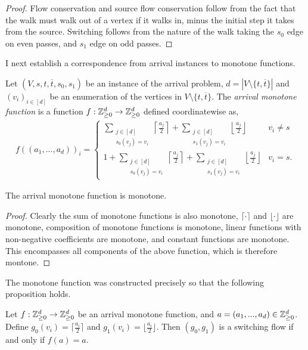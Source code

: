   \begin{proof}
    Flow conservation and source flow conservation follow from the fact that the walk must walk
    out of a vertex if it walks in, minus the initial step it takes from the source. Switching
    follows from the nature of the walk taking the $s_0$ edge on even passes, and $s_1$ edge on odd
    passes.
  \end{proof}
  I next establish a correspondence from arrival instances to monotone functions.
  \begin{definition}
    Let $(V, s, t, \overline{t}, s_0, s_1)$ be an instance of the arrival problem,
    $d = |V \setminus \{t, \overline{t}\}|$ and
    $(v_i)_{i \in [d]}$ be an enumeration of the vertices in 
    $V \setminus \{t, \overline{t}\}$. The \emph{arrival monotone function} is a function
    $f : \mathbb{Z}_{\geq 0}^d \to \mathbb{Z}_{\geq 0}^d$ defined coordinatewise as,
  \begin{align*}
    f((a_1, ..., a_d))_i = \begin{cases}
    \sum_{\substack{j \in [d] \\ s_0(v_j) = v_i}} \left\lceil \frac{a_j}{2} \right\rceil
      + \sum_{\substack{j \in [d] \\ s_1(v_j) = v_i}} \left\lfloor \frac{a_j}{2} \right\rfloor
      & v_i \neq s \\
    1 + \sum_{\substack{j \in [d] \\ s_0(v_j) = v_i}} \left\lceil \frac{a_j}{2} \right\rceil
      + \sum_{\substack{j \in [d] \\ s_1(v_j) = v_i}} \left\lfloor \frac{a_j}{2} \right\rfloor
      & v_i = s.
    \end{cases}
  \end{align*}
  \end{definition}
  \begin{lemma}\label{arrMonotoneIsMonotone}
    The arrival monotone function is monotone.
  \end{lemma}
  \begin{proof}
    Clearly the sum of monotone functions is also monotone, $\lceil \cdot \rceil$ and $\lfloor \cdot \rfloor$
    are monotone, composition of monotone functions is monotone, linear functions with non-negative coefficients
    are monotone, and constant functions are monotone. This encompasses all components of the above function,
    which is therefore montone.
  \end{proof}
  The monotone function was constructed precisely so that the following proposition holds.
  \begin{prop}\label{fixpointIsFlow}
    Let $f : \mathbb{Z}_{\geq 0}^d \to \mathbb{Z}_{\geq 0}^d$ be an arrival monotone function, and $a = (a_1, ..., a_d) \in \mathbb{Z}_{\geq 0}^d$. 
    Define $g_0(v_i) = \lceil \frac{a_i}{2} \rceil$ and $g_1(v_i) = \lfloor \frac{a_i}{2} \rfloor$. 
    Then $(g_0, g_1)$ is a switching flow if and only if $f(a) = a$.
  \end{prop}
